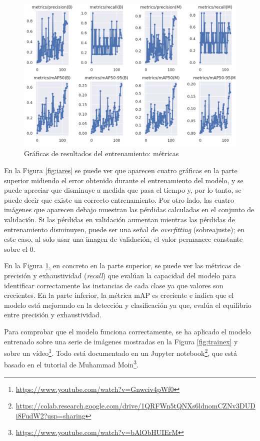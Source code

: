  \begin{figure} [h!]
	\begin{center}
		\includegraphics[width=15cm]{figs/cap6/results1.png}
	\end{center}
	\caption{Gráficas de resultados del entrenamiento: métricas}
	\label{fig:iares2}
\end{figure}

En la Figura \ref{fig:iares} se puede ver que aparecen cuatro gráficas en la parte superior midiendo el error obtenido durante el entrenamiento del modelo, y se puede apreciar que disminuye a medida que pasa el tiempo y, por lo tanto, se puede decir que existe un correcto entrenamiento. Por otro lado, las cuatro imágenes que aparecen debajo muestran las pérdidas calculadas en el conjunto de validación. Si las pérdidas en validación aumentan mientras las pérdidas de entrenamiento disminuyen, puede ser una señal de \textit{overfitting} (sobreajuste); en este caso, al solo usar una imagen de validación, el valor permanece constante sobre el 0.

En la Figura \ref{fig:iares2}, en concreto en la parte superior, se puede ver las métricas de precisión y exhaustividad (\textit{recall}) que evalúan la capacidad del modelo para identificar correctamente las instancias de cada clase ya que valores son crecientes. En la parte inferior, la métrica \ac{mAP} es creciente e indica que el modelo está mejorando en la detección y clasificación ya que, evalúa el equilibrio entre precisión y exhaustividad.

Para comprobar que el modelo funciona correctamente, se ha aplicado el modelo entrenado sobre una serie de imágenes mostradas en la Figura \ref{fig:trainex} y sobre un vídeo\footnote{\url{https://www.youtube.com/watch?v=Gnwciv4pWf0}}. Todo está documentado en un Jupyter notebook\footnote{\url{https://colab.research.google.com/drive/1QRFWn5tQNXs6ldnomCZNv3DUDi8FudW2?usp=sharing}}, que está basado en el tutorial de Muhammad Moin\footnote{\url{https://www.youtube.com/watch?v=bAlObHUIErM}}.

